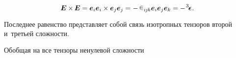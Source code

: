 \begin{otherlanguage}{russian}
%
%
%
\vspace{-0.32em}\begin{equation}\label{iso:twothree}
\bm{E} \times \hspace{-0.16ex} \bm{E} = \bm{e}_i \bm{e}_i \times \bm{e}_j \bm{e}_j = \hspace{-0.4ex} \tikzmark{BeginECrossE} - \hspace{-0.2ex} \levicivita_{i\hspace{-0.1ex}j\hspace{-0.1ex}k} \bm{e}_i \bm{e}_j \bm{e}_k \tikzmark{EndECrossE} = - \hspace{.2ex} \levicivitatensor \hspace{0.1ex}.
\end{equation}
%

\vspace{-0.5em} \noindent Последнее равенство представляет собой связь изотропных тензоров второй и~третьей сложности.

Обобщая на все тензоры ненулевой сложности


\end{otherlanguage}
